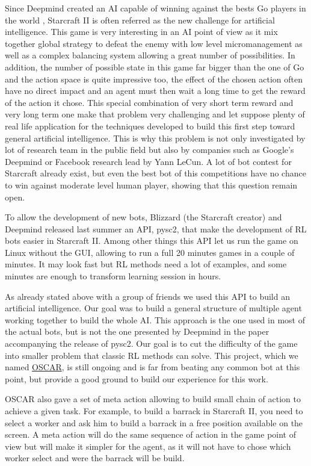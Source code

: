 \documentclass[twocolumn,a4paper,10pt]{article}
\begin{document}
Since Deepmind created an AI capable of winning against the bests
Go players in the world \cite{AlphaGo0}, Starcraft II is often referred
as the new challenge for artificial intelligence. This game is very
interesting in an AI point of view as it mix together global strategy
to defeat the enemy with low level micromanagement as well as a complex
balancing system allowing a great number of possibilities. In addition,
the number of possible state in this game far bigger than the one
of Go and the action space is quite impressive too, the effect of
the chosen action often have no direct impact and an agent must then
wait a long time to get the reward of the action it chose. This special
combination of very short term reward and very long term one make
that problem very challenging and let suppose plenty of real life
application for the techniques developed to build this first step
toward general artificial intelligence. This is why this problem is
not only investigated by lot of research team in the public field
but also by companies such as Google's Deepmind or Facebook research
lead by Yann LeCun. A lot of bot contest for Starcraft already exist,
but even the best bot of this competitions have no chance to win against
moderate level human player, showing that this question remain open.

To allow the development of new bots, Blizzard (the Starcraft creator)
and Deepmind released last summer an API, pysc2, that make the development
of RL bots easier in Starcraft II. Among other things this API let
us run the game on Linux without the GUI, allowing to run a full 20
minutes games in a couple of minutes. It may look fast but RL methods
need a lot of examples, and some minutes are enough to transform learning
session in hours.

As already stated above with a group of friends we used this API to
build an artificial intelligence. Our goal was to build a general
structure of multiple agent working together to build the whole AI.
This approach is the one used in most of the actual bots, but is not
the one presented by Deepmind in the paper accompanying the release
of pysc2. Our goal is to cut the difficulty of the game into smaller
problem that classic RL methods can solve. This project, which we
named \href{https://github.com/Xaxetrov/OSCAR}{OSCAR}, is still ongoing
and is far from beating any common bot at this point, but provide
a good ground to build our experience for this work.

OSCAR also gave a set of meta action allowing to build small chain
of action to achieve a given task. For example, to build a barrack
in Starcraft II, you need to select a worker and ask him to build
a barrack in a free position available on the screen. A meta action
will do the same sequence of action in the game point of view but
will make it simpler for the agent, as it will not have to chose which
worker select and were the barrack will be build.
\end{document}
